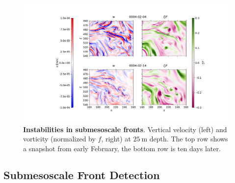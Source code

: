 \begin{figure}[h]
    \centering
    \includegraphics[width=16cm, trim=4cm 0 0 0]{../figures/result_snapshot_instabilities}
    \caption[Instabilities in submesoscale fronts]{\textbf{Instabilities in submesoscale fronts}. Vertical velocity (left) and vorticity (normalized by $f$, right) at $\SI{25}{\metre}$ depth. The top row shows a snapshot from early February, the bottom row is ten days later.}\label{fig:subm-sample-mli}
\end{figure}

\subsection{Submesoscale Front Detection}\label{sec:subm-detection}

